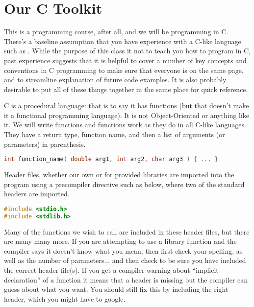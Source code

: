 



\section*{Our C Toolkit}

This is a programming course, after all, and we will be programming in C. There's a baseline assumption that you have experience with a C-like language such as \Cpp. While the purpose of this class it not to teach you how to program in C, past experience  suggests that it is helpful to cover a number of key concepts and conventions in C programming to make sure that everyone is on the same page, and to streamline explanation of future code examples. It is also probably desirable to put all of these things together in the same place for quick reference.

C is a procedural language: that is to say it has functions (but that doesn't make it a functional programming language). It is not Object-Oriented or anything like it. We will write functions and functions work as they do in all C-like languages. They have a return type, function name, and then a list of arguments (or parameters) in parenthesis.

\begin{lstlisting}[language=C]
int function_name( double arg1, int arg2, char arg3 ) { ... }
\end{lstlisting}

Header files, whether our own or for provided libraries are imported into the program using a precompiler directive such as below, where two of the standard headers are imported.

\begin{lstlisting}[language=C]
#include <stdio.h>
#include <stdlib.h>
\end{lstlisting}

Many of the functions we wish to call are included in these header files, but there are many many more. If you are attempting to use a library function and the compiler says it doesn't know what you mean, then first check your spelling, as well as the number of parameters... and then check to be sure you have included the correct header file(s). If you get a compiler warning about ``implicit declaration'' of a function it means that a header is missing but the compiler can guess about what you want. You should still fix this by including the right header, which you might have to google.

